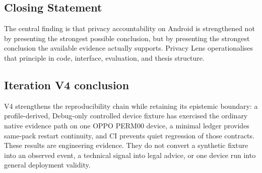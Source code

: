 \subsection{Closing Statement}

The central finding is that privacy accountability on Android is strengthened not by presenting the strongest possible conclusion, but by presenting the strongest conclusion the available evidence actually supports. Privacy Lens operationalises that principle in code, interface, evaluation, and thesis structure.

\subsection{Iteration V4 conclusion}

V4 strengthens the reproducibility chain while retaining its epistemic boundary: a profile-derived, Debug-only controlled device fixture has exercised the ordinary native evidence path on one OPPO PERM00 device, a minimal ledger provides same-pack restart continuity, and CI prevents quiet regression of those contracts. These results are engineering evidence. They do not convert a synthetic fixture into an observed event, a technical signal into legal advice, or one device run into general deployment validity.
